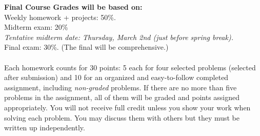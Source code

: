 \documentclass[10pt]{article}
\begin{document}
{\bf Final Course Grades will be based on:} \\
 Weekly homework + projects: 50\%.\\ %
Midterm exam: 20\%\\
{\it Tentative midterm date: Thursday, March 2nd (just before spring break).}\\
Final exam: 30\%. (The final will be comprehensive.)\\\\
 Each homework counts for 30 points:
5 each for four selected problems (selected after submission) and 10 
for an organized and easy-to-follow completed assignment, including
{\it non-graded} problems. If there are no more than five problems in
the assignment, all of them will be graded and points assigned
appropriately. You will not receive full credit unless you show your
work when solving each problem.  You may discuss
them with others but they  must be written up independently.\\\\
\newpage
\end{document}
